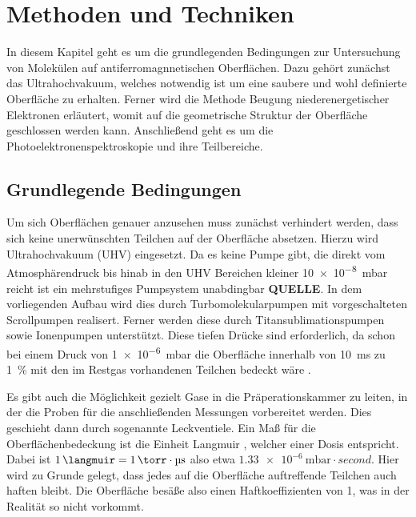 \chapter{Methoden und Techniken} \label{cha:Methoden}
    In diesem Kapitel geht es um die grundlegenden Bedingungen zur Untersuchung von Molekülen auf antiferromagnnetischen Oberflächen.
    Dazu gehört zunächst das Ultrahochvakuum, welches notwendig ist um eine saubere und wohl definierte Oberfläche zu erhalten.
    Ferner wird die Methode Beugung niederenergetischer Elektronen erläutert, womit auf die geometrische Struktur der Oberfläche geschlossen werden kann.
    Anschließend geht es um die Photoelektronenspektroskopie und ihre Teilbereiche.

    \section{Grundlegende Bedingungen} \label{sec:Grundlagen}
    Um sich Oberflächen genauer anzusehen muss zunächst verhindert werden, dass sich keine unerwünschten Teilchen auf der Oberfläche absetzen.
    Hierzu wird Ultrahochvakuum (UHV) eingesetzt.
    Da es keine Pumpe gibt, die direkt vom Atmosphärendruck bis hinab in den UHV Bereichen kleiner \SI{10e-8}{\milli\bar} reicht ist ein mehrstufiges Pumpsystem unabdingbar \textbf{QUELLE}.
    In dem vorliegenden Aufbau wird dies durch Turbomolekularpumpen mit vorgeschalteten Scrollpumpen realisert.
    Ferner werden diese durch Titansublimationspumpen sowie Ionenpumpen unterstützt.
    Diese tiefen Drücke sind erforderlich, da schon bei einem Druck von \SI{1e-6}{\milli\bar} die Oberfläche innerhalb von \SI{10}{\milli\second} zu \SI{1}{\percent} mit den im Restgas vorhandenen Teilchen bedeckt wäre \cite{henzler}.

    Es gibt auch die Möglichkeit gezielt Gase in die Präperationskammer zu leiten, in der die Proben für die anschließenden Messungen vorbereitet werden.
    Dies geschieht dann durch sogenannte Leckventiele.
    Ein Maß für die Oberflächenbedeckung ist die Einheit Langmuir \si{\langmuir}, welcher einer Dosis entspricht.
    Dabei ist $\SI{1}{\langmuir} = \SI{1}{\torr} \cdot \si{\micro\second}$ also etwa $\SI{1.33e-6}{\milli\bar} \cdot \si{second}$.
    Hier wird zu Grunde gelegt, dass jedes auf die Oberfläche auftreffende Teilchen auch haften bleibt. 
    Die Oberfläche besäße also einen Haftkoeffizienten von \num{1}, was in der Realität so nicht vorkommt.

